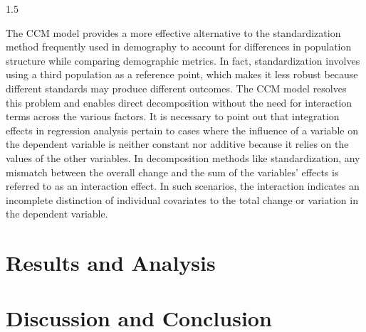 \documentclass{article}
\begin{document}
\begin{spacing}{1.5}
  
  \vspace{0.7em}\par
The CCM model provides a more effective alternative to the standardization method frequently used in demography to account for differences in population structure while comparing demographic metrics. In fact, standardization involves using a third population as a reference point, which makes it less robust because different standards may produce different outcomes. The CCM model resolves this problem and enables direct decomposition without the need for interaction terms across the various factors. It is necessary to point out that integration effects in regression analysis pertain to cases where the influence of a variable on the dependent variable is neither constant nor additive because it relies on the values of the other variables. In decomposition methods like standardization, any mismatch between the overall change and the sum of the variables’ effects is referred to as an interaction effect. In such scenarios, the interaction indicates an incomplete distinction of individual covariates to the total change or variation in the dependent variable. 


\section{Results and Analysis}

\section{Discussion and Conclusion}

\printbibliography

\end{spacing}
\end{document}
